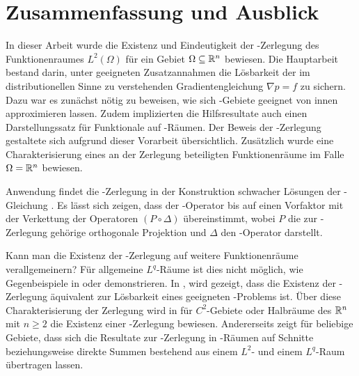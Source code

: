 \chapter{Zusammenfassung und Ausblick}

In dieser Arbeit wurde die Existenz und Eindeutigkeit der \helmholtz\hyp{}Zerlegung des Funktionenraumes $L^2(\Omega)$ für ein Gebiet $\Omega \subseteq \mathbb{R}^n$ bewiesen.
Die Hauptarbeit bestand darin, unter geeigneten Zusatzannahmen die Lösbarkeit der im distributionellen Sinne zu verstehenden Gradientengleichung $\nabla p = f$ zu sichern.
Dazu war es zunächst nötig zu beweisen, wie sich \lipschitz\hyp{}Gebiete geeignet von innen approximieren lassen.
Zudem implizierten die Hilfsresultate auch einen Darstellungssatz für Funktionale auf \sobolev\hyp{}Räumen.
Der Beweis der \helmholtz\hyp{}Zerlegung gestaltete sich aufgrund dieser Vorarbeit übersichtlich.
Zusätzlich wurde eine Charakterisierung eines an der Zerlegung beteiligten Funktionenräume im Falle $\Omega = \mathbb{R}^n$ bewiesen.

Anwendung findet die \helmholtz\hyp{}Zerlegung in der Konstruktion schwacher Lösungen der \stokes\hyp{}Gleichung \cite[S.129f.]{sohr2001navier}. 
Es lässt sich zeigen, dass der \stokes\hyp{}Operator bis auf einen Vorfaktor mit der Verkettung der Operatoren $(P \circ \Delta)$ übereinstimmt, wobei $P$ die zur \helmholtz\hyp{}Zerlegung gehörige orthogonale Projektion und $\Delta$ den \laplace\hyp{}Operator darstellt.

Kann man die Existenz der \helmholtz\hyp{}Zerlegung auf weitere Funktionenräume verallgemeinern?
Für allgemeine $L^q$\hyp{}Räume ist dies nicht möglich, wie Gegenbeispiele in \cite{maslennikova1986elliptic} oder \cite{bogovski1986decomposition} demonstrieren.
In \cite{simader1992new}, \cite[S.146, Lemma III.1.2]{galdi2011navier} wird gezeigt, dass die Existenz der \helmholtz\hyp{}Zerlegung äquivalent zur Lösbarkeit eines geeigneten \neumann\hyp{}Problems ist. 
Über diese Charakterisierung der Zerlegung wird in \cite[S.152, Theorem III.1.2]{galdi2011navier} für $C^2$-Gebiete oder Halbräume des $\mathbb{R}^n$ mit $n \geq 2$ die Existenz einer \helmholtz\hyp{}Zerlegung bewiesen.
Andererseits zeigt \cite{farwig05anLq} für beliebige Gebiete, dass sich die Resultate zur \helmholtz\hyp{}Zerlegung in \hilbert\hyp{}Räumen auf Schnitte beziehungsweise direkte Summen bestehend aus einem $L^2$- und einem $L^q$\hyp{}Raum übertragen lassen.

